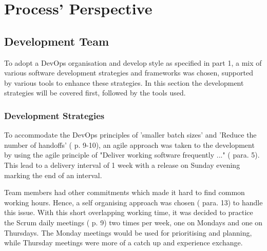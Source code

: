 \documentclass[report/main.tex]{subfiles}
\begin{document}
    \section{Process' Perspective}
    \label{Sec:process_perspective}
        \subsection{Development Team}
        \label{subsec:development-team}
            To adopt a DevOps organisation and develop style as specified in \cite{devops-handbook} part 1, a mix of various software development strategies and frameworks was chosen, supported by various tools to enhance these strategies. In this section the development strategies will be covered first, followed by the tools used.
            
            \subsubsection{Development Strategies}
            \label{subsubsec:development-strategies}
                To accommodate the DevOps principles of 'smaller batch sizes' and 'Reduce the number of handoffs' (\cite{devops-handbook} p. 9-10), an agile approach was taken to the development by using the agile principle of "Deliver working software frequently ..." (\cite{agile-manifesto-second-page} para. 5). This lead to a delivery interval of 1 week with a release on Sunday evening marking the end of an interval.
                
                Team members had other commitments which made it hard to find common working hours. Hence, a self organising approach was chosen (\cite{agile-manifesto-second-page} para. 13) to handle this issue. With this short overlapping working time, it was decided to practice the Scrum daily meetings (\cite{2020-scrum-guide} p. 9) two times per week, one on Mondays and one on Thursdays. The Monday meetings would be used for prioritising and planning, while Thursday meetings were more of a catch up and experience exchange.
                
        
\end{document}
